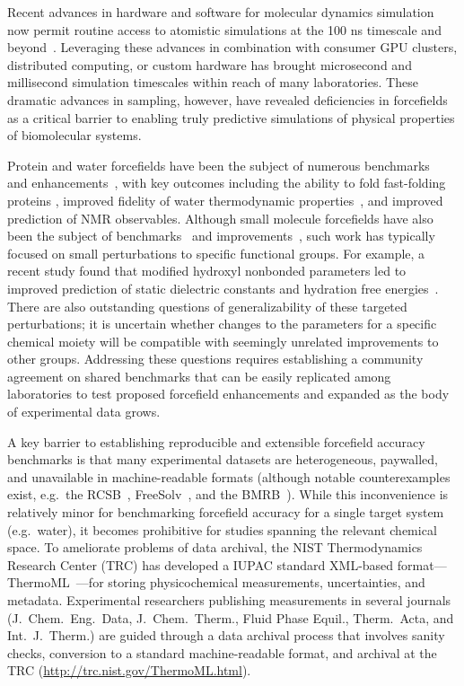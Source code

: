 \documentclass[aps,pre,twocolumn,nofootinbib,superscriptaddress,linenumbers]{revtex4-1}
\begin{document}
Recent advances in hardware and software for molecular dynamics simulation now permit routine access to atomistic simulations at the 100 ns timescale and beyond~\cite{salomon2013routine}.
Leveraging these advances in combination with consumer GPU clusters, distributed computing, or custom hardware has brought microsecond and millisecond simulation timescales within reach of many laboratories.  
These dramatic advances in sampling, however, have revealed deficiencies in forcefields as a critical barrier to enabling truly predictive simulations of physical properties of biomolecular systems.  

Protein and water forcefields have been the subject of numerous benchmarks~\cite{lindorff2012systematic} and enhancements~\cite{li2011iterative, best2012optimization, Lindorff-Larsen2010}, with key outcomes including the ability to fold fast-folding proteins \cite{shaw2011, ensign2007heterogeneity, Voelz2010}, improved fidelity of water thermodynamic properties~\cite{horn2004}, and improved prediction of NMR observables.  
Although small molecule forcefields have also been the subject of benchmarks~\cite{caleman2011force} and improvements~\cite{fennell2014fixed}, such work has typically focused on small perturbations to specific functional groups.  
For example, a recent study found that modified hydroxyl nonbonded parameters led to improved prediction of static dielectric constants and hydration free energies~\cite{fennell2014fixed}.
There are also outstanding questions of generalizability of these targeted perturbations; it is uncertain whether changes to the parameters for a specific chemical moiety will be compatible with seemingly unrelated improvements to other groups.
Addressing these questions requires establishing a community agreement on shared benchmarks that can be easily replicated among laboratories to test proposed forcefield enhancements and expanded as the body of experimental data grows.

A key barrier to establishing reproducible and extensible forcefield accuracy benchmarks is that many experimental datasets are heterogeneous, paywalled, and unavailable in machine-readable formats (although notable counterexamples exist, e.g.~the RCSB~\cite{Berman2000}, FreeSolv~\cite{freesolv}, and the BMRB~\cite{Ulrich2008}).  
While this inconvenience is relatively minor for benchmarking forcefield accuracy for a single target system (e.g.~water), it becomes prohibitive for studies spanning the relevant chemical space.  
To ameliorate problems of data archival, the NIST Thermodynamics Research Center (TRC) has developed a IUPAC standard XML-based format---ThermoML~\cite{frenkel2006xml}---for storing physicochemical measurements, uncertainties, and metadata.
Experimental researchers publishing measurements in several journals (J.~Chem.~Eng.~Data, J.~Chem.~Therm., Fluid Phase Equil., Therm.~Acta, and Int.~J.~Therm.) are guided through a data archival process that involves sanity checks, conversion to a standard machine-readable format, and archival at the TRC (\url{http://trc.nist.gov/ThermoML.html}).  
\end{document}
